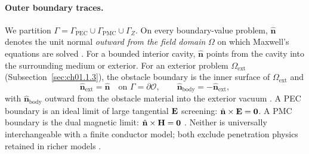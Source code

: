 \paragraph{Outer boundary traces.}
We partition $\Gamma=\Gamma_{\mathrm{PEC}}\cup\Gamma_{\mathrm{PMC}}\cup\Gamma_Z$. On every boundary-value problem, $\hat{\mathbf{n}}$ denotes the unit normal \emph{outward from the field domain} $\Omega$ on which Maxwell's equations are solved \cite{stratton1941}. For a bounded interior cavity, $\hat{\mathbf{n}}$ points from the cavity into the surrounding medium or exterior. For an exterior problem $\Omega_{\mathrm{ext}}$ (Subsection~\ref{sec:ch01.1.3}), the obstacle boundary is the inner surface of $\Omega_{\mathrm{ext}}$ and
\begin{equation}
\label{eq:ch1.exterior-normal-convention}
\hat{\mathbf{n}}_{\mathrm{ext}}=\hat{\mathbf{n}}\quad\text{on }\Gamma=\partial\mathcal{O},\qquad
\hat{\mathbf{n}}_{\mathrm{body}}=-\hat{\mathbf{n}}_{\mathrm{ext}},
\end{equation}
with $\hat{\mathbf{n}}_{\mathrm{body}}$ outward from the obstacle material into the exterior vacuum \cite{stratton1941,harrington2001}. A PEC boundary is an ideal limit of large tangential $\mathbf{E}$ screening: $\hat{\mathbf{n}}\times\mathbf{E}=\mathbf{0}$. A PMC boundary is the dual magnetic limit: $\hat{\mathbf{n}}\times\mathbf{H}=\mathbf{0}$ \cite{stratton1941}. Neither is universally interchangeable with a finite conductor model; both exclude penetration physics retained in richer models \cite{stratton1941}.

